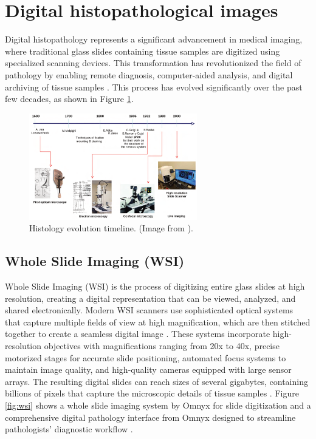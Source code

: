\section{Digital histopathological images}

Digital histopathology represents a significant advancement in
medical imaging, where traditional glass slides containing tissue
samples are digitized using specialized scanning devices. This
transformation has revolutionized the field of pathology by enabling
remote diagnosis, computer-aided analysis, and digital archiving of
tissue samples \cite{AmgadEtAl2019}. This process has evolved
significantly over the past few decades, as shown in Figure
\ref{fig:histology_evolution}.

\begin{figure}[h]
  \centering
  \includegraphics[width=0.65\textwidth]{Cap2/Figures/histology_evolution.png}
  \caption{Histology evolution timeline. (Image from \cite{MazzariniEtAl2021}).}
  \label{fig:histology_evolution}
\end{figure}

\subsection{Whole Slide Imaging (WSI)}

Whole Slide Imaging (WSI) is the process of digitizing entire glass
slides at high resolution, creating a digital representation that can
be viewed, analyzed, and shared electronically. Modern WSI scanners
use sophisticated optical systems that capture multiple fields of
view at high magnification, which are then stitched together to
create a seamless digital image \cite{DingyiEtAl2025}. These systems incorporate
high-resolution objectives with magnifications ranging from 20x to
40x, precise motorized stages for accurate slide positioning,
automated focus systems to maintain image quality, and high-quality
cameras equipped with large sensor arrays. The resulting digital
slides can reach sizes of several gigabytes, containing billions of
pixels that capture the microscopic details of tissue samples
\cite{DingyiEtAl2025}. Figure \ref{fig:wsi} shows a whole slide
imaging system by Omnyx for slide digitization and a comprehensive
digital pathology interface from Omnyx designed to streamline
pathologists' diagnostic workflow \cite{FarahaniEtAl2015}.

